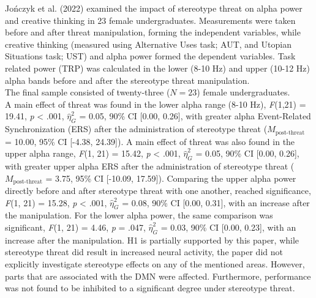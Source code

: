 \documentclass[
  stu, a4paper,floatsintext]{apa7}
\begin{document}
Jończyk et al. (2022) examined the impact of stereotype threat on alpha power and creative thinking in 23 female undergraduates.
Measurements were taken before and after threat manipulation, forming the independent variables, while creative thinking (measured using Alternative Uses task; AUT, and Utopian Situations task; UST) and alpha power formed the dependent variables.
Task related power (TRP) was calculated in the lower (8-10 Hz) and upper (10-12 Hz) alpha bands before and after the stereotype threat manipulation.\\
The final sample consisted of twenty-three (\(N = 23\)) female undergraduates.\\
A main effect of threat was found in the lower alpha range (8-10 Hz), \emph{F}(1,21) = 19.41, \emph{p} \textless{} .001, \(\hat{\eta}^{2}_{G}\) = 0.05, 90\% CI {[}0.00, 0.26{]}, with greater alpha Event-Related Synchronization (ERS) after the administration of stereotype threat (\(M_{\text{post-threat}}\) = 10.00, 95\% CI {[}-4.38, 24.39{]}).
A main effect of threat was also found in the upper alpha range, \emph{F}(1, 21) = 15.42, \emph{p} \textless{} .001, \(\hat{\eta}^{2}_{G}\) = 0.05, 90\% CI {[}0.00, 0.26{]}, with greater upper alpha ERS after the administration of stereotype threat (\(M_{\text{post-threat}}\) = 3.75, 95\% CI {[}-10.09, 17.59{]}).
Comparing the upper alpha power directly before and after stereotype threat with one another, reached significance, \emph{F}(1, 21) = 15.28, \emph{p} \textless{} .001, \(\hat{\eta}^{2}_{G}\) = 0.08, 90\% CI {[}0.00, 0.31{]}, with an increase after the manipulation.
For the lower alpha power, the same comparison was significant, \emph{F}(1, 21) = 4.46, \emph{p} = .047, \(\hat{\eta}^{2}_{G}\) = 0.03, 90\% CI {[}0.00, 0.23{]}, with an increase after the manipulation.
H1 is partially supported by this paper, while stereotype threat did result in increased neural activity, the paper did not explicitly investigate stereotype effects on any of the mentioned areas. However, parts that are associated with the DMN were affected. Furthermore, performance was not found to be inhibited to a significant degree under stereotype threat.
\end{document}
